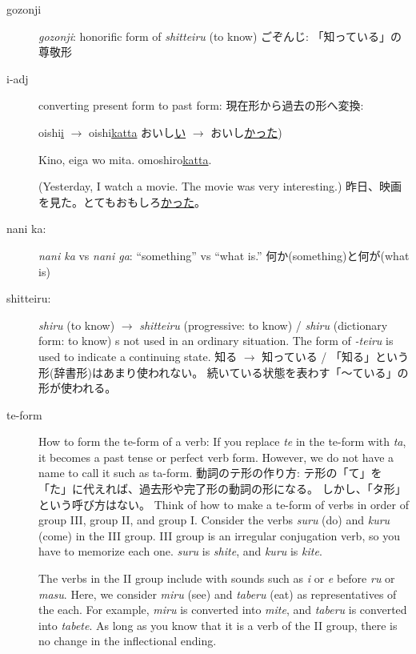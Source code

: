 \documentclass[uplatex,dvipdfmx,b5paper,english,10pt]{jsbook}
\begin{document}
\begin{description}


\item[gozonji]
\ifEnglish
{\it gozonji\/}: honorific form of {\it shitteiru\/} (to know)
\else
ごぞんじ: 「知っている」の尊敬形
\fi

\item[i-adj]
\label{gn:i-adj-past}
\ifEnglish
 converting present form to past form:
\else
 現在形から過去の形へ変換:
\fi

\ifEnglish
 oishi\underline{i} $\rightarrow$ oishi\underline{katta}
\else
 おいし\underline{い} $\rightarrow$ おいし\underline{かった})
\fi

\ifEnglish
 Kino, eiga wo mita. omoshiro\underline{katta}.

 (Yesterday, I watch a movie. The movie was very interesting.)
\else
 昨日、映画を見た。とてもおもしろ\underline{かった}。
\fi



\item[nani ka:]
\ifEnglish
{\it nani ka\/} vs {\it nani ga\/}: ``something'' vs ``what is.''
\else
何か(something)と何が(what is)
\fi


\item[shitteiru:]
\ifEnglish
{\it shiru\/} (to know) $\rightarrow$ {\it shitteiru\/} (progressive: to know) /
{\it shiru\/} (dictionary form: to know) s not used in an ordinary situation.
The form of {\it -teiru\/} is used to indicate a continuing state.
\else
知る $\rightarrow$ 知っている /
「知る」という形(辞書形)はあまり使われない。
続いている状態を表わす「～ている」の形が使われる。
\fi
\item[te-form] %
\label{te-form}
\ifEnglish
How to form the te-form of a verb:
If you replace {\it te\/} in the te-form with {\it ta\/}, it becomes a past tense or perfect verb form.
However, we do not have a name to call it such as ta-form.
\else
動詞のテ形の作り方:
テ形の「て」を「た」に代えれば、過去形や完了形の動詞の形になる。
しかし、「タ形」という呼び方はない。
\fi
\ifEnglish
Think of how to make a te-form of verbs in order of group III, group II, and group I.
Consider the verbs {\it suru\/} (do) and {\it kuru\/} (come) in the III group.
III group is an irregular conjugation verb, so you have to memorize each one. {\it suru\/} is {\it shite\/}, and {\it kuru\/} is {\it kite\/}.

The verbs in the II group include with sounds such as {\it i\/} or {\it e\/} before {\it ru\/} or {\it masu\/}.
Here, we consider {\it miru\/} (see) and {\it taberu\/} (eat)  as representatives of the each.
For example, {\it miru\/} is converted into {\it mite\/}, and {\it taberu\/} is converted into {\it tabete\/}.
As long as you know that it is a verb of the II group, there is no change in the inflectional ending.


\end{description}
\end{document}
